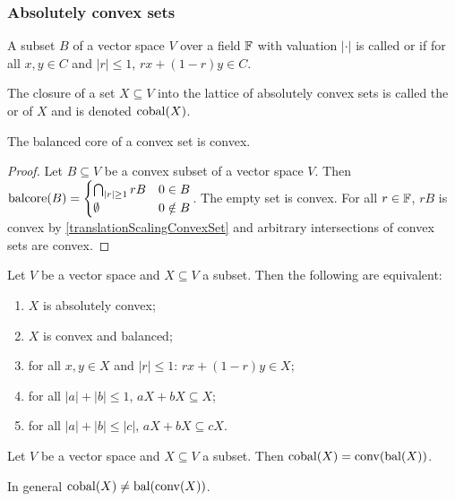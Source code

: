 \subsubsection{Absolutely convex sets}
\begin{definition}
A subset $B$ of a vector space $V$ over a field $\mathbb{F}$ with valuation $|\cdot|$ is called  or  if for all $x,y\in C$ and $|r| \leq 1$, $rx + (1-r)y\in C$.

The closure of a set $X\subseteq V$ into the lattice of absolutely convex sets is called the  or  of $X$ and is denoted $\operatorname{cobal}(X)$.
\end{definition}

\begin{lemma} \label{balancedCoreConvexSet}
The balanced core of a convex set is convex.
\end{lemma}
\begin{proof}
Let $B\subseteq V$ be a convex subset of a vector space $V$. Then
$\operatorname{balcore}(B) = \begin{cases}
\bigcap_{|r|\geq 1}rB & 0\in B\\
\emptyset & 0\notin B
\end{cases}$. The empty set is convex. For all $r\in \mathbb{F}$, $rB$ is convex by \ref{translationScalingConvexSet} and arbitrary intersections of convex sets are convex.
\end{proof}

\begin{lemma} \label{absolutelyConvexCriteria}
Let $V$ be a vector space and $X\subseteq V$ a subset. Then the following are equivalent:
\begin{enumerate}
\item $X$ is absolutely convex;
\item $X$ is convex and balanced;
\item for all $x,y\in X$ and $|r| \leq 1$:  $rx + (1-r)y\in X$;
\item for all $|a|+|b| \leq 1$, $aX +bX \subseteq X$;
\item for all $|a|+|b| \leq |c|$, $aX +bX \subseteq cX$.
\end{enumerate}
\end{lemma}

\begin{lemma} \label{diskedIsCoBal}
Let $V$ be a vector space and $X\subseteq V$ a subset. Then $\operatorname{cobal}(X) = \operatorname{conv}(\operatorname{bal}(X))$.
\end{lemma}
In general $\operatorname{cobal}(X) \neq \operatorname{bal}(\operatorname{conv}(X))$.

